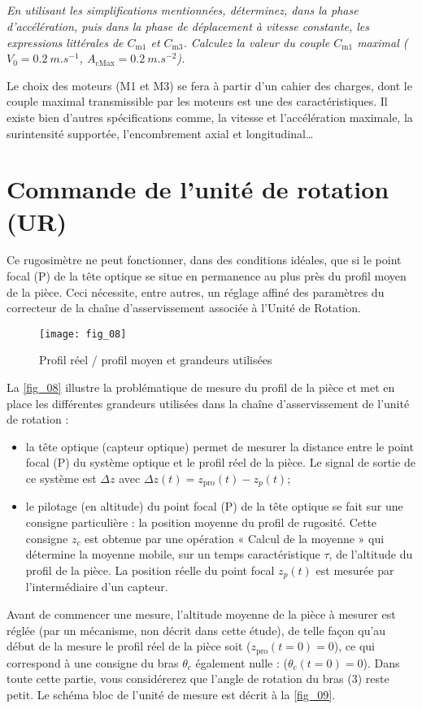 \subparagraph{\label{q_07}}\textit{En utilisant les simplifications mentionnées, déterminez, dans la phase d’accélération, puis dans la phase de déplacement à vitesse constante, les expressions littérales de $C_{\text{m1}}$ et $C_{\text{m3}}$.
Calculez la valeur du couple $C_{\text{m1}}$ maximal ($V_0 = \SI{0,2}{m.s^{-1}}$, $A_{\text{cMax}}=\SI{0,2}{m.s^{-2}}$).}

Le choix des moteurs (M1 et M3) se fera à partir d’un cahier des charges, dont le couple maximal
transmissible par les moteurs est une des caractéristiques. Il existe bien d’autres spécifications comme, la
vitesse et l’accélération maximale, la surintensité supportée, l’encombrement axial et longitudinal…


\section{Commande de l'unité de rotation (UR)}
Ce rugosimètre ne peut fonctionner, dans des conditions idéales, que si le point focal (P) de la tête optique
se situe en permanence au plus près du profil moyen de la pièce. Ceci nécessite, entre autres, un réglage
affiné des paramètres du correcteur de la chaîne d’asservissement associée à l’Unité de Rotation.

\begin{figure}[H]
\centering
\texttt{[image: fig\_08]}
\caption{\label{fig_08} Profil réel / profil moyen et grandeurs utilisées}
\end{figure}

La \autoref{fig_08} illustre la problématique de mesure du profil de la pièce et met en place les différentes
grandeurs utilisées dans la chaîne d’asservissement de l’unité de rotation :
\begin{itemize}
\item la tête optique (capteur optique) permet de mesurer la distance entre le point focal (P) du système
optique et le profil réel de la pièce. Le signal de sortie de ce système est $\Delta z$ avec
$\Delta z(t)=z_{\text{pro}}(t)-z_p(t)$;
\item le pilotage (en altitude) du point focal (P) de la tête optique se fait sur une consigne particulière : la
position moyenne du profil de rugosité. Cette consigne $z_c$ est obtenue par une opération « Calcul de
la moyenne » qui détermine la moyenne mobile, sur un temps caractéristique $\tau$, de l’altitude du
profil de la pièce. La position réelle du point focal $z_p(t)$ est mesurée par l’intermédiaire d’un
capteur.
\end{itemize}
Avant de commencer une mesure, l’altitude moyenne de la pièce à mesurer est réglée (par un mécanisme,
non décrit dans cette étude), de telle façon qu’au début de la mesure le profil réel de la pièce soit
($z_{\text{pro}}(t=0)=0$), ce qui correspond à une consigne du bras $\theta_c$ également nulle : ($\theta_{c}(t=0)=0$).
Dans toute cette partie, vous considérerez que l’angle de rotation du bras (3) reste petit.
Le schéma bloc de l’unité de mesure est décrit à la \autoref{fig_09}.


